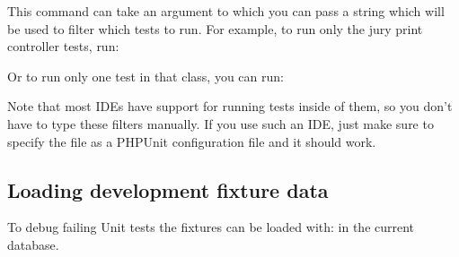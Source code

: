 \documentclass[a4paper,10pt,english,openany]{sphinxmanual}
\begin{document}
\sphinxAtStartPar
This command can take an argument  to which you can pass a string
which will be used to filter which tests to run. For example, to run only the
jury print controller tests, run:

\begin{sphinxVerbatim}[commandchars=\\\{\}]
    \PYGZbs{}
\end{sphinxVerbatim}

\sphinxAtStartPar
Or to run only one test in that class, you can run:

\begin{sphinxVerbatim}[commandchars=\\\{\}]
    \PYGZbs{}
\end{sphinxVerbatim}

\sphinxAtStartPar
Note that most IDEs have support for running tests inside of them, so you don’t
have to type these filters manually. If you use such an IDE, just make sure to
specify the  file as a PHPUnit configuration file and
it should work.


\subsection{Loading development fixture data}
\label{\detokenize{develop:loading-development-fixture-data}}
\sphinxAtStartPar
To debug failing Unit tests the fixtures can be loaded with:
 in the current database.
\end{document}
